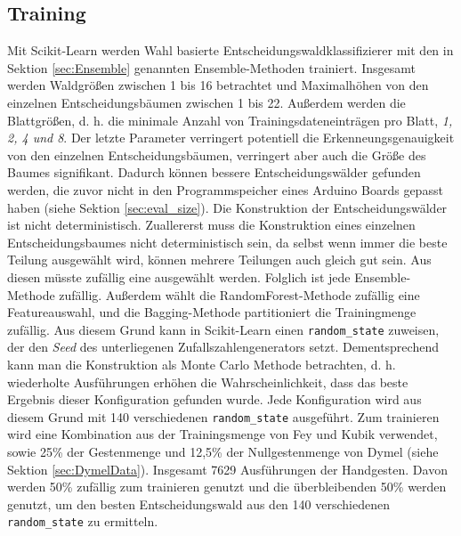 \subsection{Training}
\label{sec:Training}
Mit Scikit-Learn werden Wahl basierte Entscheidungswaldklassifizierer mit den in Sektion \ref{sec:Ensemble} genannten Ensemble-Methoden trainiert. Insgesamt werden Waldgrößen zwischen 1 bis 16 betrachtet und
Maximalhöhen von den einzelnen Entscheidungsbäumen zwischen 1 bis 22. Außerdem werden die Blattgrößen, d. h. die minimale Anzahl von Trainingsdateneinträgen pro Blatt, \textit{1, 2, 4 und 8}.
\newline
\newline
Der letzte Parameter verringert potentiell die Erkenneungsgenauigkeit von den einzelnen Entscheidungsbäumen, verringert aber auch die Größe des Baumes signifikant.
Dadurch können bessere Entscheidungswälder gefunden werden, die zuvor nicht in den Programmspeicher eines Arduino Boards gepasst haben (siehe Sektion \ref{sec:eval_size}).
\newline
\newline
Die Konstruktion der Entscheidungswälder ist nicht deterministisch. Zuallererst muss die Konstruktion eines einzelnen Entscheidungsbaumes nicht deterministisch sein, da selbst wenn immer die beste Teilung
ausgewählt wird, können mehrere Teilungen auch gleich gut sein. Aus diesen müsste zufällig eine ausgewählt werden. Folglich ist jede Ensemble-Methode zufällig. Außerdem wählt die RandomForest-Methode
zufällig eine Featureauswahl, und die Bagging-Methode partitioniert die Trainingmenge zufällig. Aus diesem Grund kann in Scikit-Learn einen \texttt{random\_state} zuweisen, der den \textit{Seed} des
unterliegenen Zufallszahlengenerators setzt.
\newline
\newline
Dementsprechend kann man die Konstruktion als Monte Carlo Methode betrachten, d. h. wiederholte Ausführungen erhöhen die Wahrscheinlichkeit, dass das beste Ergebnis dieser Konfiguration gefunden wurde.
Jede Konfiguration wird aus diesem Grund mit 140 verschiedenen \texttt{random\_state} ausgeführt.
\newline
\newline
Zum trainieren wird eine Kombination aus der Trainingsmenge von Fey und Kubik verwendet, sowie 25\% der Gestenmenge und 12,5\% der Nullgestenmenge von Dymel (siehe Sektion \ref{sec:DymelData}). Insgesamt 7629
Ausführungen der Handgesten. Davon werden 50\% zufällig zum trainieren genutzt und die überbleibenden 50\% werden genutzt, um den besten Entscheidungswald aus den 140 verschiedenen \texttt{random\_state}
zu ermitteln.

